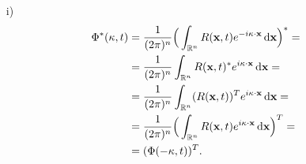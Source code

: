 \documentclass[mat2, tisk]{fmfdelo}
\newcommand{\R}{\mathbb R}
\newcommand{\bd}{\textbf}
\begin{document}
\begin{dokaz}
\begin{enumerate}
  \item[i)] 
  \begin{align*}
  \Phi^*(\text{\bd{$\kappa$}}, t) &= \frac{1}{(2\pi)^n} \Big(\int_{\R^n} {R}(\bd{x}, t) e^{-i\text{\bd{$\kappa$}} \cdot \bd{x}} \dif \bd{x}\Big)^* = \\
  &= \frac{1}{(2\pi)^n} \int_{\R^n} {R}(\bd{x}, t)^* e^{i\text{\bd{$\kappa$}} \cdot \bd{x}} \dif \bd{x} = \\
  &= \frac{1}{(2\pi)^n} \int_{\R^n} ({R}(\bd{x}, t))^T e^{i\text{\bd{$\kappa$}} \cdot \bd{x}} \dif \bd{x} = \\
  &= \frac{1}{(2\pi)^n} \Big(\int_{\R^n} {R}(\bd{x}, t) e^{i\text{\bd{$\kappa$}} \cdot \bd{x}} \dif \bd{x}\Big)^T = \\
  &= (\Phi(-\text{\bd{$\kappa$}}, t))^T.
  \end{align*}


\end{enumerate}
\end{dokaz}
\end{document}

